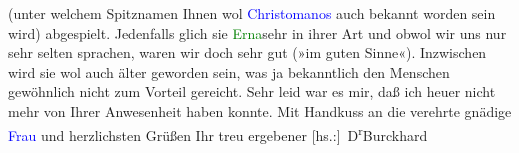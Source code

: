                     (unter welchem Spitznamen Ihnen wol \textcolor{blue}{Christomanos}{}\ledrightnote{\textcolor{blue}{Theodor Christomannos}} auch bekannt worden sein wird) abgespielt. Jedenfalls
                    glich sie \textcolor{green}{Erna}{}sehr in ihrer Art und obwol wir uns nur sehr
                    selten sprachen, waren wir doch sehr gut (»im guten Sinne«). Inzwischen wird sie
                    wol auch älter geworden sein, was ja bekanntlich den Menschen gewöhnlich nicht
                    zum Vorteil gereicht.\pend
           \pstart
           Sehr leid war es mir, daß ich heuer nicht mehr von Ihrer Anwesenheit haben
                    konnte. Mit Handkuss an die verehrte gnädige \textcolor{blue}{Frau}{} und herzlichsten Grüßen Ihr treu ergebener\pend
           \pstart \spacefill\mbox{{[}hs.:{]} D\textsuperscript{r}Burckhard}\pend{}\endnumbering{}  
      